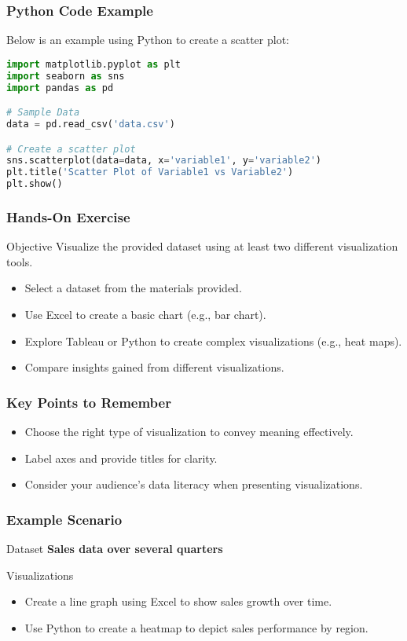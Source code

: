 \documentclass[aspectratio=169]{beamer}
\begin{document}
\begin{frame}[fragile]
    \frametitle{Python Code Example}
    Below is an example using Python to create a scatter plot:
    \begin{lstlisting}[language=Python]
import matplotlib.pyplot as plt
import seaborn as sns
import pandas as pd

# Sample Data
data = pd.read_csv('data.csv')

# Create a scatter plot
sns.scatterplot(data=data, x='variable1', y='variable2')
plt.title('Scatter Plot of Variable1 vs Variable2')
plt.show()
    \end{lstlisting}
\end{frame}

\begin{frame}
    \frametitle{Hands-On Exercise}
    \begin{block}{Objective}
        Visualize the provided dataset using at least two different visualization tools.
    \end{block}
    \begin{itemize}
        \item Select a dataset from the materials provided.
        \item Use Excel to create a basic chart (e.g., bar chart).
        \item Explore Tableau or Python to create complex visualizations (e.g., heat maps).
        \item Compare insights gained from different visualizations.
    \end{itemize}
\end{frame}

\begin{frame}
    \frametitle{Key Points to Remember}
    \begin{itemize}
        \item Choose the right type of visualization to convey meaning effectively.
        \item Label axes and provide titles for clarity.
        \item Consider your audience's data literacy when presenting visualizations.
    \end{itemize}
\end{frame}

\begin{frame}
    \frametitle{Example Scenario}
    \begin{block}{Dataset}
        \textbf{Sales data over several quarters}
    \end{block}
    \begin{block}{Visualizations}
        \begin{itemize}
            \item Create a line graph using Excel to show sales growth over time.
            \item Use Python to create a heatmap to depict sales performance by region.
        \end{itemize}
    \end{block}
\end{frame}
\end{document}
